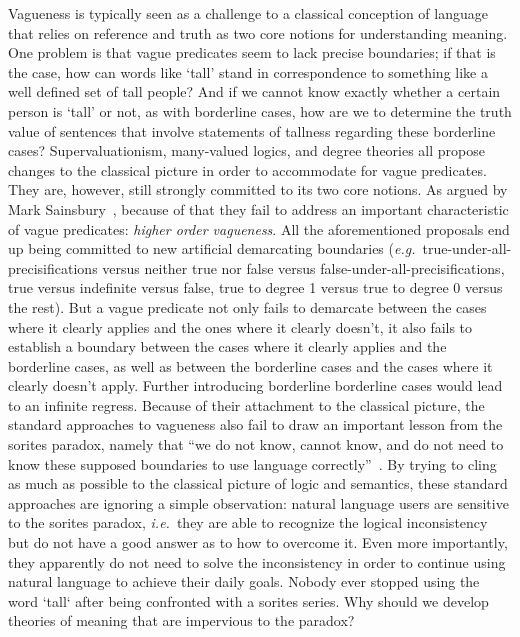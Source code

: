 \documentclass[a4paper]{article}
\begin{document}
Vagueness is typically seen as a challenge to a classical conception of language that relies on reference and truth as two core notions for understanding meaning.
One problem is that vague predicates seem to lack precise boundaries; if that is the case, how can words like `tall' stand in correspondence to something like a well defined set of tall people?
And if we cannot know exactly whether a certain person is `tall' or not, as with borderline cases, how are we to determine the truth value of sentences that involve statements of tallness regarding these borderline cases?
Supervaluationism, many-valued logics, and degree theories all propose changes to the classical picture in order to accommodate for vague predicates.
They are, however, still strongly committed to its two core notions.
As argued by Mark Sainsbury~\parencite*{sainsbury_concepts_1999}, because of that they fail to address an important characteristic of vague predicates: \emph{higher order vagueness}.
All the aforementioned proposals end up being committed to new artificial demarcating boundaries (\emph{e.g.}~true-under-all-precisifications versus neither true nor false versus false-under-all-precisifications, true versus indefinite versus false, true to degree 1 versus true to degree 0 versus the rest).
But a vague predicate not only fails to demarcate between the cases where it clearly applies and the ones where it clearly doesn't, it also fails to establish a boundary between the cases where it clearly applies and the borderline cases, as well as between the borderline cases and the cases where it clearly doesn't apply.
Further introducing borderline borderline cases would lead to an infinite regress.
Because of their attachment to the classical picture, the standard approaches to vagueness also fail to draw an important lesson from the sorites paradox, namely that ``we do not know, cannot know, and do not need to know these supposed boundaries to use language correctly''~\parencite*[256]{sainsbury_concepts_1999}.
By trying to cling as much as possible to the classical picture of logic and semantics, these standard approaches are ignoring a simple observation: natural language users are sensitive to the sorites paradox, \emph{i.e.}~they are able to recognize the logical inconsistency but do not have a good answer as to how to overcome it.
Even more importantly, they apparently do not need to solve the inconsistency in order to continue using natural language to achieve their daily goals.
Nobody ever stopped using the word `tall` after being confronted with a sorites series.
Why should we develop theories of meaning that are impervious to the paradox?
\end{document}
